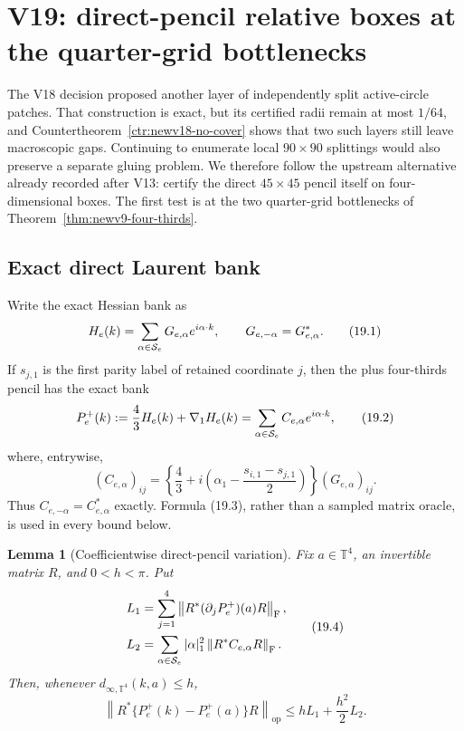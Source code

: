 \documentclass[11pt,oneside]{article}
\newtheorem{lemma}[theorem]{Lemma}
\theoremstyle{definition}
\theoremstyle{remark}
\begin{document}
\section{V19: direct-pencil relative boxes at the quarter-grid bottlenecks}
\label{sec:newv19-direct}

The V18 decision proposed another layer of independently split
active-circle patches.  That construction is exact, but its certified
radii remain at most \(1/64\), and
Countertheorem~\ref{ctr:newv18-no-cover} shows that two such layers
still leave macroscopic gaps.  Continuing to enumerate local
\(90\times90\) splittings would also preserve a separate gluing
problem.  We therefore follow the upstream alternative already
recorded after V13: certify the direct \(45\times45\) pencil itself
on four-dimensional boxes.  The first test is at the two
quarter-grid bottlenecks of Theorem~\ref{thm:newv9-four-thirds}.

\subsection{Exact direct Laurent bank}

Write the exact Hessian bank as
\[
 H_e(k)=\sum_{\alpha\in{\cal S}_e}
 G_{e,\alpha}e^{i\alpha\cdot k},\qquad
 G_{e,-\alpha}=G_{e,\alpha}^*.                           \tag{19.1}
\]
If \(s_{j,1}\) is the first parity label of retained coordinate
\(j\), then the plus four-thirds pencil has the exact bank
\[
 P_e^+(k):=\frac43H_e(k)+\nabla_1H_e(k)
 =\sum_{\alpha\in{\cal S}_e}C_{e,\alpha}e^{i\alpha\cdot k},
                                                                  \tag{19.2}
\]
where, entrywise,
\[
 (C_{e,\alpha})_{ij}
 =
 \left\{\frac43+
 i\left(\alpha_1-\frac{s_{i,1}-s_{j,1}}2\right)\right\}
 (G_{e,\alpha})_{ij}.                                   \tag{19.3}
\]
Thus \(C_{e,-\alpha}=C_{e,\alpha}^*\) exactly.  Formula
(19.3), rather than a sampled matrix oracle, is used in every bound
below.

\begin{lemma}[Coefficientwise direct-pencil variation]
\label{lem:newv19-direct-variation}
Fix \(a\in\mathbb T^4\), an invertible matrix \(R\), and \(0<h<\pi\).
Put
\[
\begin{aligned}
 L_1&=\sum_{j=1}^4
 \left\|R^*(\partial_jP_e^+)(a)R\right\|_{\mathrm F},\\
 L_2&=\sum_{\alpha\in{\cal S}_e}
 |\alpha|_1^2\left\|R^*C_{e,\alpha}R\right\|_{\mathrm F}.
\end{aligned}                                            \tag{19.4}
\]
Then, whenever
\(d_{\infty,\mathbb T^4}(k,a)\le h\),
\[
 \left\|R^*\{P_e^+(k)-P_e^+(a)\}R\right\|_{\mathrm{op}}
 \le hL_1+\frac{h^2}{2}L_2.                             \tag{19.5}
\]
\end{lemma}
\end{document}
